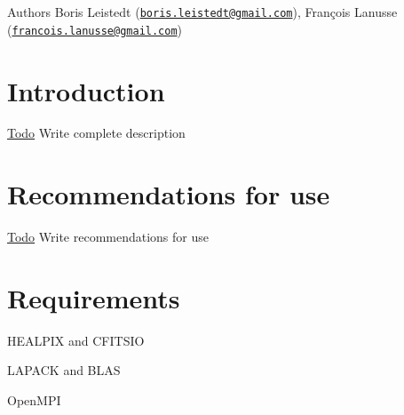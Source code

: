 \begin{DoxyAuthor}{Authors}
Boris Leistedt (\href{mailto:boris.leistedt@gmail.com}{\tt boris.leistedt@gmail.com}), François Lanusse (\href{mailto:francois.lanusse@gmail.com}{\tt francois.lanusse@gmail.com})
\end{DoxyAuthor}
\hypertarget{index_intro}{}\section{Introduction}\label{index_intro}
\begin{Desc}
\item[\hyperlink{todo__todo000001}{Todo}]Write complete description\end{Desc}
\hypertarget{index_recommendations}{}\section{Recommendations for use}\label{index_recommendations}
\begin{Desc}
\item[\hyperlink{todo__todo000002}{Todo}]Write recommendations for use\end{Desc}
\hypertarget{index_requirements}{}\section{Requirements}\label{index_requirements}

\begin{DoxyItemize}
\item HEALPIX and CFITSIO
\end{DoxyItemize}


\begin{DoxyItemize}
\item LAPACK and BLAS
\end{DoxyItemize}


\begin{DoxyItemize}
\item OpenMPI 
\end{DoxyItemize}